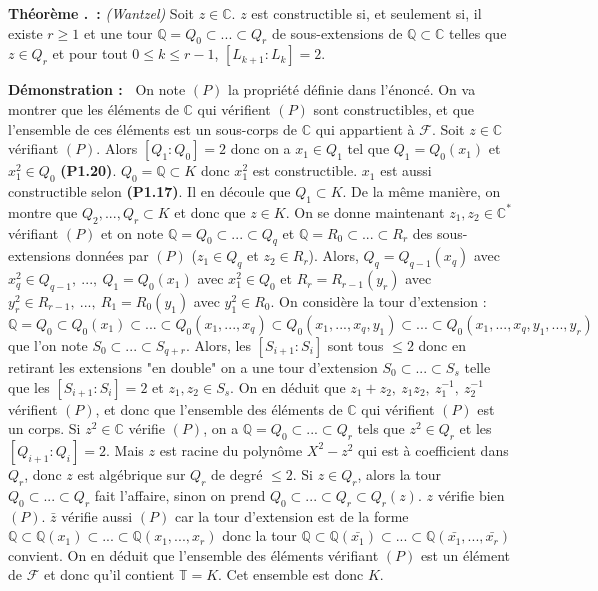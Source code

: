 \documentclass[5pt,a4paper]{article}
\newcounter{thmcounter}[subsection]
\renewcommand{\thethmcounter}{\thesubsection.\arabic{thmcounter}}
\newcommand{\thm}[1]{
    \stepcounter{thmcounter}
    \hypertarget{t:\thethmcounter}{}%
    \noindent\textbf{Théorème \thethmcounter ~:} #1 \newline
}
\newcommand{\demo}[1]{
    \textbf{Démonstration :~} #1 \newline
}
\begin{document}
\begin{onehalfspacing}
\thm{\textit{(Wantzel)} Soit $z \in \mathbb{C}$. $z$ est constructible si, et seulement si, il existe $r \geq 1$ et une tour $\mathbb{Q} = Q_0 \subset ... \subset Q_r$ de sous-extensions de $\mathbb{Q} \subset \mathbb{C}$ telles que $z \in Q_r$ et pour tout $0 \leq k \leq r-1$, $[L_{k+1} : L_k] = 2$.}
\demo{On note $(P)$ la propriété définie dans l'énoncé. On va montrer que les éléments de $\mathbb{C}$ qui vérifient $(P)$ sont constructibles, et que l'ensemble de ces éléments est un sous-corps de $\mathbb{C}$ qui appartient à $\mathcal{F}$. Soit $z \in \mathbb{C}$ vérifiant $(P)$. Alors $[Q_1 : Q_0] = 2$ donc on a $x_1 \in Q_1$ tel que $Q_1 = Q_0(x_1)$ et $x_1^2 \in Q_0$ \textbf{(P1.20)}. $Q_0 = \mathbb{Q} \subset K$ donc $x_1^2$ est constructible. $x_1$ est aussi constructible selon \textbf{(P1.17)}. Il en découle que $Q_1 \subset K$. De la même manière, on montre que $Q_2, ..., Q_r \subset K$ et donc que $z \in K$. On se donne maintenant $z_1, z_2 \in \mathbb{C}^*$ vérifiant $(P)$ et on note $\mathbb{Q} = Q_0 \subset ... \subset Q_q$ et $\mathbb{Q} = R_0 \subset ... \subset R_r$ des sous-extensions données par $(P)$ ($z_1 \in Q_q$ et $z_2 \in R_r$). Alors, $Q_q = Q_{q-1}(x_q)$ avec $x_q^2 \in Q_{q-1},~...,~Q_1 = Q_0(x_1)$ avec $x_1^2 \in Q_0$ et $R_r = R_{r-1}(y_r)$ avec $y_r^2 \in R_{r-1},~...,~R_1 = R_0(y_1)$ avec $y_1^2 \in R_0$. On considère la tour d'extension : $\mathbb{Q} = Q_0 \subset Q_0(x_1) \subset ... \subset Q_0(x_1, ...,x_q) \subset Q_0(x_1, ...,x_q,y_1) \subset ... \subset Q_0(x_1, ...,x_q,y_1, ...,y_r)$ que l'on note $S_0 \subset ... \subset S_{q+r}$. Alors, les $[S_{i+1} : S_i]$ sont tous $\leq 2$ donc en retirant les extensions "en double" on a une tour d'extension $S_0 \subset ... \subset S_{s}$ telle que les $[S_{i+1} : S_i] = 2$ et $z_1, z_2 \in S_s$. On en déduit que $z_1 + z_2,~z_1z_2,~z_1^{-1},~z_2^{-1}$ vérifient $(P)$, et donc que l'ensemble des éléments de $\mathbb{C}$ qui vérifient $(P)$ est un corps. Si $z^2 \in \mathbb{C}$ vérifie $(P)$, on a $\mathbb{Q} = Q_0 \subset ... \subset Q_r$ tels que $z^2 \in Q_r$ et les $[Q_{i+1} : Q_i] = 2$. Mais $z$ est racine du polynôme $X^2 - z^2$ qui est à coefficient dans $Q_r$, donc $z$ est algébrique sur $Q_r$ de degré $\leq 2$. Si $z \in Q_r$, alors la tour $Q_0 \subset ... \subset Q_r$ fait l'affaire, sinon on prend $Q_0 \subset ... \subset Q_r \subset Q_r(z)$. $z$ vérifie bien $(P)$. $\bar{z}$ vérifie aussi $(P)$ car la tour d'extension est de la forme $\mathbb{Q} \subset \mathbb{Q}(x_1) \subset ... \subset \mathbb{Q}(x_1, ..., x_r)$ donc la tour $\mathbb{Q} \subset \mathbb{Q}(\bar{x_1}) \subset ... \subset \mathbb{Q}(\bar{x_1}, ..., \bar{x_r})$ convient. On en déduit que l'ensemble des éléments vérifiant $(P)$ est un élément de $\mathcal{F}$ et donc qu'il contient $\mathbb{T} = K$. Cet ensemble est donc $K$.}


\end{onehalfspacing}
\end{document}
